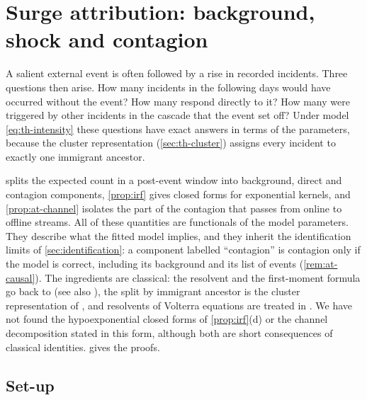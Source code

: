 \section{Surge attribution: background, shock and contagion}\label{sec:attribution}

A salient external event is often followed by a rise in recorded incidents. Three
questions then arise. How many incidents in the following days would have occurred
without the event? How many respond directly to it? How many were triggered by other
incidents in the cascade that the event set off? Under model \eqref{eq:th-intensity}
these questions have exact answers in terms of the parameters, because the cluster
representation (\cref{sec:th-cluster}) assigns every incident to exactly one
immigrant ancestor.

 splits the expected count in a post-event window into
background, direct and contagion components, \cref{prop:irf} gives closed forms for
exponential kernels, and \cref{prop:at-channel} isolates the part of the contagion that
passes from online to offline streams. All of these quantities are functionals of the
model parameters. They describe what the fitted model implies, and they inherit the
identification limits of \cref{sec:identification}: a component labelled ``contagion'' is
contagion only if the model is correct, including its background and its list of events
(\cref{rem:at-causal}). The ingredients are classical: the resolvent and the first-moment
formula go back to \citet{hawkes1971} (see also \citealp{bacry2015,laub2021}), the split by
immigrant ancestor is the cluster representation of \citet{hawkes1974}, and resolvents of
Volterra equations are treated in \citet{gripenberg1990}. We have not found the
hypoexponential closed forms of \cref{prop:irf}(d) or the channel decomposition stated in
this form, although both are short consequences of classical identities.
 gives the proofs.

\subsection{Set-up}\label{sec:at-setup}

